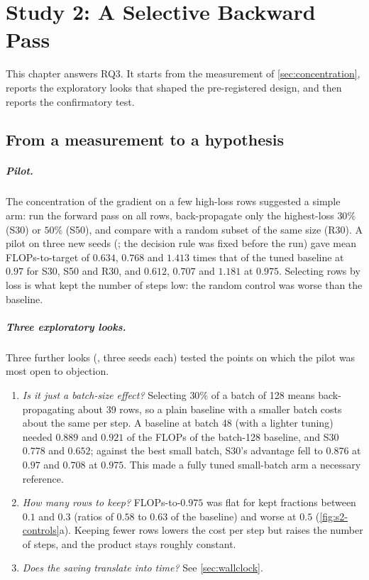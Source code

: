 \chapter{Study 2: A Selective Backward Pass}\label{ch:study2}

This chapter answers RQ3. It starts from the measurement of \cref{sec:concentration}, reports the exploratory looks that shaped the pre-registered design, and then reports the confirmatory test.

\section{From a measurement to a hypothesis}\label{sec:s2-lead}
\paragraph{Pilot.} The concentration of the gradient on a few high-loss rows suggested a simple arm: run the forward pass on all rows, back-propagate only the highest-loss $30\%$ (S30) or $50\%$ (S50), and compare with a random subset of the same size (R30). A pilot on three new seeds (\tierE{}; the decision rule was fixed before the run) gave mean FLOPs-to-target of $0.634$, $0.768$ and $1.413$ times that of the tuned baseline at $0.97$ for S30, S50 and R30, and $0.612$, $0.707$ and $1.181$ at $0.975$. Selecting rows by loss is what kept the number of steps low: the random control was worse than the baseline.

\paragraph{Three exploratory looks.} Three further looks (\tierE{}, three seeds each) tested the points on which the pilot was most open to objection.
\begin{enumerate}
\item \emph{Is it just a batch-size effect?} Selecting $30\%$ of a batch of 128 means back-propagating about 39 rows, so a plain baseline with a smaller batch costs about the same per step. A baseline at batch 48 (with a lighter tuning) needed $0.889$ and $0.921$ of the FLOPs of the batch-128 baseline, and S30 $0.778$ and $0.652$; against the best small batch, S30's advantage fell to $0.876$ at $0.97$ and $0.708$ at $0.975$. This made a fully tuned small-batch arm a necessary reference.
\item \emph{How many rows to keep?} FLOPs-to-$0.975$ was flat for kept fractions between $0.1$ and $0.3$ (ratios of $0.58$ to $0.63$ of the baseline) and worse at $0.5$ (\cref{fig:s2-controls}a). Keeping fewer rows lowers the cost per step but raises the number of steps, and the product stays roughly constant.
\item \emph{Does the saving translate into time?} See \cref{sec:wallclock}.
\end{enumerate}

